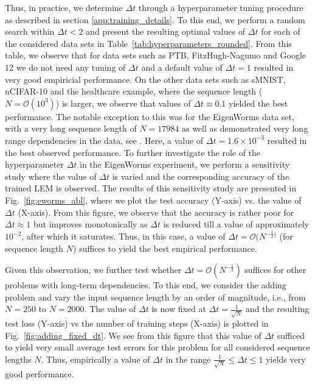 \documentclass{article} \usepackage{iclr2022_conference,times}
\newcommand{\ord}{{\mathcal O}}
\newcommand{\Dt}{{\Delta t}}
\newcommand{\fref}[1] {Fig.~\ref{#1}}
\newcommand{\Tref}[1]{Table~\ref{#1}}
\begin{document}
Thus, in practice, we determine $\Dt$ through a hyperparameter tuning procedure as described in section \ref{app:training_details}. To this end, we perform a random search within $\Dt < 2$ and present the resulting optimal values of $\Dt$ for each of the considered data sets in \Tref{tab:hyperparameters_rounded}. From this table, we observe that for data sets such as PTB, FitzHugh-Nagumo and Google 12
we do not need any tuning of $\Dt$ and a default value of $\Dt=1$ resulted in very good empiricial performance. On the other data sets such as sMNIST, nCIFAR-10 and the healthcare example, where the sequence length ($N = \ord(10^3)$) is larger, we observe that values of $\Dt \approx 0.1$ yielded the best performance. The notable exception to this was for the EigenWorms data set, with a very long sequence length of $N=17984$ as well as demonstrated very long range dependencies in the data, see \cite{unicornn}. Here, a value of $\Dt = 1.6\times 10^{-3}$ resulted in the best observed performance. To further investigate the role of the hyperparameter $\Dt$ in the EigenWorms experiment, we perform a sensitivity study where the value of $\Dt$ is varied and the corresponding accuracy of the trained LEM is observed. The results of this sensitivity study are presented in \fref{fig:eworms_abl}, where we plot the test accuracy (Y-axis) vs. the value of $\Dt$ (X-axis). From this figure, we observe that the accuracy is rather poor for $\Dt \approx 1$ but improves monotonically as $\Dt$ is reduced till a value of approximately $10^{-2}$, after which it saturates. Thus, in this case, a value of $\Dt = \ord(N^{-\frac{1}{2})}$ (for sequence length $N$) suffices to yield the best empirical performance. 

Given this observation, we further test whether $\Dt = \ord(N^{-\frac{1}{2}})$ suffices for other problems with long-term dependencies. To this end, we consider the adding problem and vary the input sequence length by an order of magnitude, i.e., from $N=250$ to $N=2000$. The value of $\Dt$ is now fixed at $\Dt = \frac{1}{\sqrt{N}}$ and the resulting test loss (Y-axis) vs the number of training steps (X-axis) is plotted in \fref{fig:adding_fixed_dt}. We see from this figure that this value of $\Dt$ sufficed to yield very small average test errors for this problem for all considered sequence lengths $N$. Thus, empirically a value of $\Dt$ in the range $\frac{1}{\sqrt{N}} \leq \Dt \leq 1$ yields very good performance. 
\end{document}
